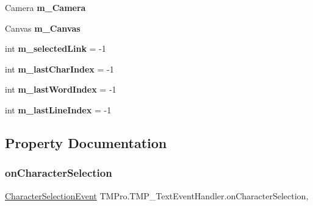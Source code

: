 \begin{DoxyCompactItemize}
\mbox{\label{class_t_m_pro_1_1_t_m_p___text_event_handler_a316c024d55df84c4f33d7d5143c7955f}} 
Camera {\bfseries m\+\_\+\+Camera}
\item 
\mbox{\label{class_t_m_pro_1_1_t_m_p___text_event_handler_a5fd5b58a306ec7fd6ce186e6aa0c0739}} 
Canvas {\bfseries m\+\_\+\+Canvas}
\item 
\mbox{\label{class_t_m_pro_1_1_t_m_p___text_event_handler_a2091d9c27a1491c0857399396ec1ff4c}} 
int {\bfseries m\+\_\+selected\+Link} = -\/1
\item 
\mbox{\label{class_t_m_pro_1_1_t_m_p___text_event_handler_a8c5ebc0971a592fd24402fb3257898a7}} 
int {\bfseries m\+\_\+last\+Char\+Index} = -\/1
\item 
\mbox{\label{class_t_m_pro_1_1_t_m_p___text_event_handler_a4f1edae5ad22db4cafbd7a2299599343}} 
int {\bfseries m\+\_\+last\+Word\+Index} = -\/1
\item 
\mbox{\label{class_t_m_pro_1_1_t_m_p___text_event_handler_a65523117f80e74fca4e782d11571663e}} 
int {\bfseries m\+\_\+last\+Line\+Index} = -\/1
\end{DoxyCompactItemize}


\subsection{Property Documentation}
\mbox{\label{class_t_m_pro_1_1_t_m_p___text_event_handler_adf246c6977702948b7ab987f34bf12a2}} 
\subsubsection{\texorpdfstring{on\+Character\+Selection}{onCharacterSelection}}
{\footnotesize\ttfamily \hyperlink{class_t_m_pro_1_1_t_m_p___text_event_handler_1_1_character_selection_event}{Character\+Selection\+Event} T\+M\+Pro.\+T\+M\+P\+\_\+\+Text\+Event\+Handler.\+on\+Character\+Selection\hspace{0.3cm}{\ttfamily [get]}, {\ttfamily [set]}}



